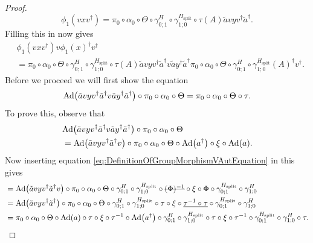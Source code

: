 \documentclass[12pt,a4paper,twoside]{article}
\newcommand{\stkout}[1]{\ifmmode\text{\sout{\ensuremath{#1}}}\else\sout{#1}\fi}
\let\originalleft\left
\let\originalright\right
\renewcommand{\left}{\mathopen{}\mathclose\bgroup\originalleft}
\renewcommand{\right}{\aftergroup\egroup\originalright}
\newcommand{\Ad}[1]{\textrm{Ad}\left(#1\right)}
\theoremstyle{definition}
\numberwithin{equation}{section}
\begin{document}
\begin{proof}
	\begin{equation}
		\phi_1(vxv^\dagger)=\pi_0\circ\alpha_0\circ\Theta\circ\gamma^{H}_{0;1}\circ\gamma^{H_{\text{split}}}_{1;0}\circ\tau(A)\tilde{a}vyv^\dagger\tilde{a}^\dagger.
	\end{equation}
	Filling this in now gives
	\begin{align}
	&\phi_1(vxv^\dagger)v\phi_1(x)^\dagger v^\dagger\\
	\label{eq:lem:phi1phi2matchingCondition:Proof_v_Part1}
	&=\pi_0\circ\alpha_0\circ\Theta\circ\gamma^{H}_{0;1}\circ\gamma^{H_{\text{split}}}_{1;0}\circ\tau(A)\tilde{a}vyv^\dagger\tilde{a}^\dagger v \tilde{a}y^\dagger\tilde{a}^\dagger \pi_0\circ\alpha_0\circ\Theta\circ\gamma^{H}_{0;1}\circ\gamma^{H_{\text{split}}}_{1;0}(A)^\dagger v^\dagger.
	\end{align}
	Before we proceed we will first show the equation
	\begin{equation}\label{eq:lem:phi1phi2matchingCondition:Proof_v_Part2}
		\Ad{\tilde{a}vyv^\dagger\tilde{a}^\dagger v\tilde{a}y^\dagger\tilde{a}^\dagger}\circ\pi_0\circ\alpha_0\circ\Theta=\pi_0\circ\alpha_0\circ\Theta\circ\tau.
	\end{equation}
	To prove this, observe that
	\begin{align}
	&\Ad{\tilde{a}vyv^\dagger\tilde{a}^\dagger v\tilde{a}y^\dagger\tilde{a}^\dagger}\circ\pi_0\circ\alpha_0\circ\Theta\\
	&=\Ad{\tilde{a}vyv^\dagger\tilde{a}^\dagger v}\circ\pi_0\circ\alpha_0\circ\Theta\circ\Ad{a^\dagger}\circ\xi\circ\Ad{a}.
	\end{align}
	Now inserting equation \eqref{eq:DefinitionOfGroupMorphismVAutEquation} in this gives
	\begin{align}
	&=\Ad{\tilde{a}vyv^\dagger\tilde{a}^\dagger v}\circ\pi_0\circ\alpha_0\circ\Theta\circ\gamma^{H}_{0;1}\circ\gamma^{H_{\text{split}}}_{1;0}\circ\stkout{(\Phi)^{-1}}\circ\xi\circ\stkout{\Phi}\circ\gamma^{H_{\text{split}}}_{0;1}\circ\gamma^H_{1;0}\\
	&=\Ad{\tilde{a}vyv^\dagger\tilde{a}^\dagger }\circ\pi_0\circ\alpha_0\circ\Theta\circ\gamma^{H}_{0;1}\circ\gamma^{H_{\text{split}}}_{1;0}\circ\tau\circ\xi\circ\underline{\tau^{-1}\circ\tau}\circ\gamma^{H_{\text{split}}}_{0;1}\circ\gamma^H_{1;0}\\
	&=\pi_0\circ\alpha_0\circ\Theta\circ\Ad{a}\circ\tau\circ\xi\circ\tau^{-1}\circ\Ad{a^\dagger}\circ\gamma^{H}_{0;1}\circ\gamma^{H_{\text{split}}}_{1;0}\circ\tau\circ\xi\circ\tau^{-1}\circ\gamma^{H_{\text{split}}}_{0;1}\circ\gamma^H_{1;0}\circ\tau.
	\end{align}

\end{proof}
\end{document}
